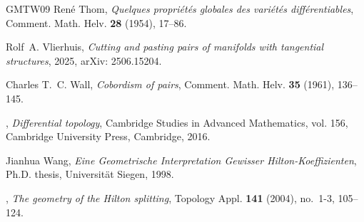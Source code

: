 \documentclass[a4paper, 11pt,reqno]{amsart}
\theoremstyle{plain}
\theoremstyle{definition}
\begin{document}
\begin{thebibliography}{GMTW09}
Ren\'{e} Thom, \emph{Quelques propri\'{e}t\'{e}s globales des vari\'{e}t\'{e}s diff\'{e}rentiables}, Comment. Math. Helv. \textbf{28} (1954), 17--86.

Rolf~A. Vlierhuis, \emph{Cutting and pasting pairs of manifolds with tangential structures}, 2025, arXiv: 2506.15204.

Charles T.~C. Wall, \emph{Cobordism of pairs}, Comment. Math. Helv. \textbf{35} (1961), 136--145.

\bysame, \emph{Differential topology}, Cambridge Studies in Advanced Mathematics, vol. 156, Cambridge University Press, Cambridge, 2016.

Jianhua Wang, \emph{{E}ine {G}eometrische {I}nterpretation {G}ewisser {H}ilton-{K}oeffizienten}, {P}h.{D}. thesis, Universit\"{a}t Siegen, 1998.

\bysame, \emph{The geometry of the {H}ilton splitting}, Topology Appl. \textbf{141} (2004), no.~1-3, 105--124.

\end{thebibliography}

	
\end{document}
